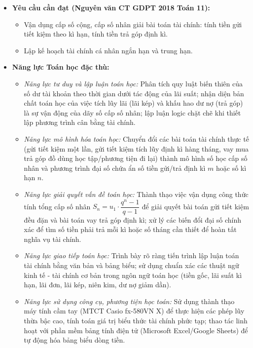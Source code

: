 \documentclass[12pt, a4paper]{article}
\begin{document}
\begin{itemize}[leftmargin=1.2cm]
    \item \textbf{Yêu cầu cần đạt (Nguyên văn CT GDPT 2018 Toán 11):}
    \begin{itemize}[leftmargin=0.6cm]
        \item Vận dụng cấp số cộng, cấp số nhân giải bài toán tài chính: tính tiền gửi tiết kiệm theo kì hạn, tính tiền trả góp định kì.
        \item Lập kế hoạch tài chính cá nhân ngắn hạn và trung hạn.
    \end{itemize}

    \item \textbf{Năng lực Toán học đặc thù:}
    \begin{itemize}[leftmargin=0.6cm]
        \item \textit{Năng lực tư duy và lập luận toán học:} Phân tích quy luật biến thiên của số dư tài khoản theo thời gian dưới tác động của lãi suất; nhận diện bản chất toán học của việc tích lũy lãi (lãi kép) và khấu hao dư nợ (trả góp) là sự vận động của dãy số cấp số nhân; lập luận logic chặt chẽ khi thiết lập phương trình cân bằng tài chính.
        \item \textit{Năng lực mô hình hóa toán học:} Chuyển đổi các bài toán tài chính thực tế (gửi tiết kiệm một lần, gửi tiết kiệm tích lũy định kì hàng tháng, vay mua trả góp đồ dùng học tập/phương tiện đi lại) thành mô hình số học cấp số nhân và phương trình đại số chứa ẩn số tiền gửi/trả định kì $m$ hoặc số kì hạn $n$.
        \item \textit{Năng lực giải quyết vấn đề toán học:} Thành thạo việc vận dụng công thức tính tổng cấp số nhân $S_n = u_1 \cdot \dfrac{q^n - 1}{q - 1}$ để giải quyết bài toán gửi tiết kiệm đều đặn và bài toán vay trả góp định kì; xử lý các biến đổi đại số chính xác để tìm số tiền phải trả mỗi kì hoặc số tháng cần thiết để hoàn tất nghĩa vụ tài chính.
        \item \textit{Năng lực giao tiếp toán học:} Trình bày rõ ràng tiến trình lập luận toán tài chính bằng văn bản và bảng biểu; sử dụng chuẩn xác các thuật ngữ kinh tế - tài chính cơ bản trong ngôn ngữ toán học (tiền gốc, lãi suất kì hạn, lãi đơn, lãi kép, niên kim, dư nợ giảm dần).
        \item \textit{Năng lực sử dụng công cụ, phương tiện học toán:} Sử dụng thành thạo máy tính cầm tay (MTCT Casio fx-580VN X) để thực hiện các phép lũy thừa bậc cao, tính toán giá trị biểu thức tài chính phức tạp; thao tác linh hoạt với phần mềm bảng tính điện tử (Microsoft Excel/Google Sheets) để tự động hóa bảng biểu dòng tiền.
    \end{itemize}


\end{itemize}
\end{document}
